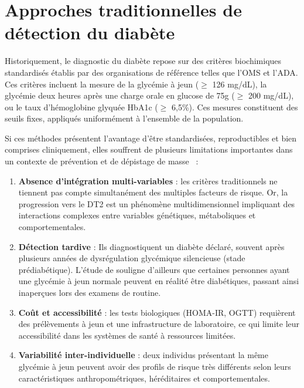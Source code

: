 \section{Approches traditionnelles de détection du diabète}

Historiquement, le diagnostic du diabète repose sur des critères biochimiques standardisés
établis par des organisations de référence telles que l'OMS et l'ADA. Ces critères incluent
la mesure de la glycémie à jeun ($\geq$ 126 mg/dL), la glycémie deux heures après une charge
orale en glucose de 75g ($\geq$ 200 mg/dL), ou le taux d'hémoglobine glyquée HbA1c
($\geq$ 6,5\%). Ces mesures constituent des seuils fixes, appliqués uniformément à l'ensemble
de la population.

Si ces méthodes présentent l'avantage d'être standardisées, reproductibles et bien comprises
cliniquement, elles souffrent de plusieurs limitations importantes dans un contexte de
prévention et de dépistage de masse~\citep{sisodia2018} :

\begin{enumerate}
	\item \textbf{Absence d'intégration multi-variables} : les critères traditionnels ne tiennent
	pas compte simultanément des multiples facteurs de risque. Or, la progression vers le DT2
	est un phénomène multidimensionnel impliquant des interactions complexes entre variables
	génétiques, métaboliques et comportementales.
	
	\item \textbf{Détection tardive} : Ils diagnostiquent un diabète déclaré, souvent après plusieurs 
	années de dysrégulation glycémique silencieuse (stade prédiabétique). 
	L'étude de \cite{lv2023detection} souligne d'ailleurs que certaines personnes ayant une glycémie 
	à jeun normale peuvent en réalité être diabétiques, passant ainsi inaperçues lors des examens de routine.

	\item \textbf{Coût et accessibilité} : les tests biologiques (HOMA-IR, OGTT) requièrent des
	prélèvements à jeun et une infrastructure de laboratoire, ce qui limite leur accessibilité
	dans les systèmes de santé à ressources limitées.
	
	\item \textbf{Variabilité inter-individuelle} : deux individus présentant la même glycémie à
	jeun peuvent avoir des profils de risque très différents selon leurs caractéristiques
	anthropométriques, héréditaires et comportementales.
\end{enumerate}


